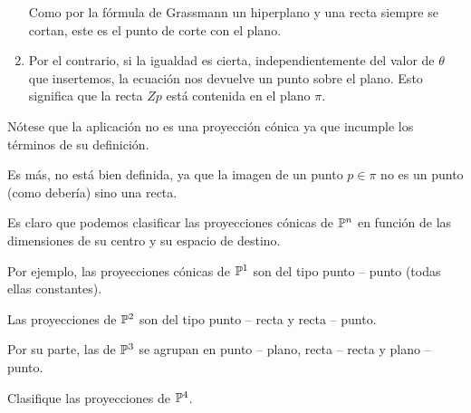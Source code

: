 \begin{exa}
\begin{enumerate}
		Como por la fórmula de Grassmann un hiperplano y una recta siempre se cortan, este es el punto de corte con el plano.
		\item Por el contrario, si la igualdad es cierta, independientemente del valor de $\theta$ que insertemos, la ecuación nos devuelve un punto sobre el plano. Esto significa que la recta $Zp$ está contenida en el plano $\pi$.
	\end{enumerate}
	Nótese que la aplicación no es una proyección cónica ya que incumple los términos de su definición.
	
	Es más, no está bien definida, ya que la imagen de un punto $p\in\pi$ no es un punto (como debería) sino una recta.
\end{exa}
\begin{exa}
	Es claro que podemos clasificar las proyecciones cónicas de $\mathbb{P}^n$ en función de las dimensiones de su centro y su espacio de destino.
	
	Por ejemplo, las proyecciones cónicas de $\mathbb{P}^1$ son del tipo punto -- punto (todas ellas constantes).
	
	Las proyecciones de $\mathbb{P}^2$ son del tipo punto -- recta y recta -- punto. 
	
	Por su parte, las de $\mathbb{P}^3$ se agrupan en punto -- plano, recta -- recta y plano -- punto.
\end{exa}
\begin{exerc}
	Clasifique las proyecciones de $\mathbb{P}^4$.
\end{exerc}
